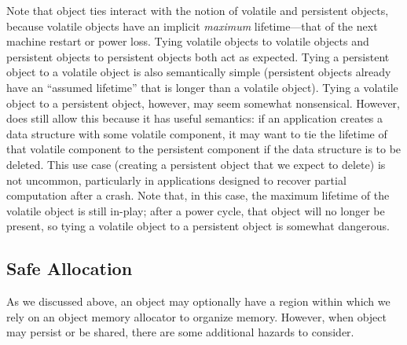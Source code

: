 Note that object ties interact with the notion of volatile and persistent objects, because
volatile objects have an implicit \emph{maximum} lifetime---that of the next machine restart or
power loss. Tying volatile objects to volatile objects and persistent objects to persistent objects both act as
expected. Tying a persistent object to a volatile object is also semantically simple (persistent
objects already have an ``assumed lifetime'' that is longer than a volatile object). Tying a
volatile object to a persistent object, however, may seem somewhat nonsensical. However, \Twizzler
does still allow this because it has useful semantics: if an application creates a data structure
with some volatile component,
it may want to tie the lifetime of that volatile component to the
persistent component if the data structure is to be deleted. This use case (creating a persistent
object that we expect to delete) is not uncommon, particularly in applications designed to recover
partial computation after a crash. Note that, in this case, the maximum
lifetime of the volatile object is still in-play; after a power cycle, that object will no longer be
present, so tying a volatile object to a persistent object is somewhat dangerous.


\subsection{Safe Allocation}

As we discussed above, an object may optionally have a region within which we rely on an object memory allocator to
organize memory. However, when object may persist or be shared, there are some additional hazards to consider.

